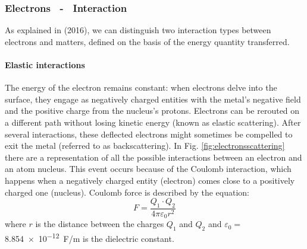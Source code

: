 \subsubsection{Electrons ~- ~Interaction}
\label{sssec:electroninteractions}
As explained in \citeauthor{korner_additive_2016} (2016), we can distinguish two interaction types between electrons and matters, defined on the basis of the energy quantity transferred. 
\paragraph{Elastic interactions} The energy of the electron remains constant: when electrons delve into the surface, they engage as negatively charged entities with the metal's negative field and the positive charge from the nucleus's protons. Electrons can be rerouted on a different path without losing kinetic energy (known as elastic scattering). After several interactions, these deflected electrons might sometimes be compelled to exit the metal (referred to as backscattering). In Fig. \ref{fig:electronsscattering} there are a representation of all the possible interactions between an electron and an atom nucleus. This event occurs because of the Coulomb interaction, which happens when a negatively charged entity (electron) comes close to a positively charged one (nucleus). Coulomb force is described by the equation:
\begin{equation}
    \label{eq:coulomb}
    F=\frac{Q_1\cdot Q_2}{4\pi \varepsilon_0 r^2}
\end{equation}
where $r$ is the distance between the charges $Q_1$ and $Q_2$ and $\varepsilon_0=$ \SI{8.854e-12}{\farad / \metre} is the dielectric constant. 
